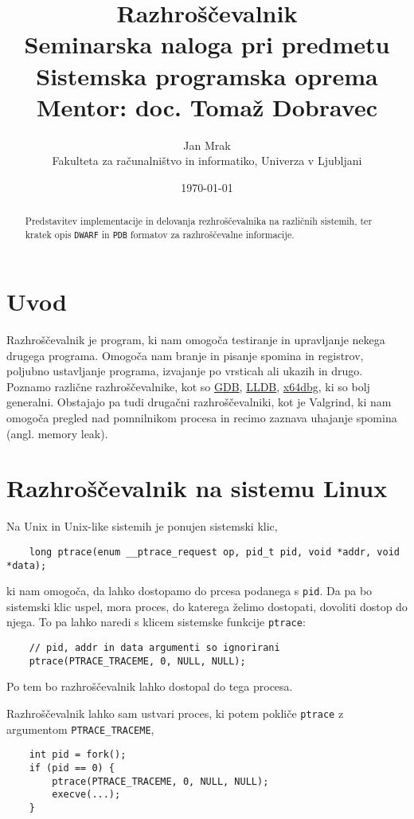 \documentclass[a4paper,notitlepage]{article}
\author{Jan Mrak \\
    \small Fakulteta za računalništvo in informatiko, Univerza v Ljubljani}
\title{Razhroščevalnik\\
    \small Seminarska naloga pri predmetu Sistemska programska oprema
    \\
    \small Mentor: doc. Tomaž Dobravec}
\date{\today}
\newcommand{\code}[1]{\texttt{#1}}
\begin{document}
\maketitle
\thispagestyle{empty}

\begin{abstract}
	Predstavitev implementacije in delovanja rezhroščevalnika na različnih sistemih, ter kratek opis \code{DWARF} in \code{PDB} formatov za razhroščevalne informacije.
\end{abstract}

\section{Uvod}

Razhroščevalnik je program, ki nam omogoča testiranje in upravljanje nekega drugega programa. Omogoča nam branje in pisanje spomina in registrov, poljubno ustavljanje programa, izvajanje po vrsticah ali ukazih in drugo.
Poznamo različne razhroščevalnike, kot so \href{https://www.sourceware.org/gdb/}{GDB}, \href{https://lldb.llvm.org/}{LLDB}, \href{https://x64dbg.com/}{x64dbg}, ki so bolj generalni. Obstajajo pa tudi drugačni razhroščevalniki, kot je Valgrind, ki nam omogoča pregled nad pomnilnikom procesa in recimo zaznava uhajanje spomina (angl. memory leak).

\section{Razhroščevalnik na sistemu Linux}

Na Unix in Unix-like sistemih je ponujen sistemski klic,
\begin{verbatim}
    long ptrace(enum __ptrace_request op, pid_t pid, void *addr, void *data);    
\end{verbatim}
ki nam omogoča, da lahko dostopamo do prcesa podanega s \code{pid}. Da pa bo sistemski klic uspel, mora proces, do katerega želimo dostopati, dovoliti dostop do njega.
To pa lahko naredi s klicem sistemske funkcije \code{ptrace}:
\begin{verbatim}
    // pid, addr in data argumenti so ignorirani
    ptrace(PTRACE_TRACEME, 0, NULL, NULL);
\end{verbatim}

Po tem bo razhroščevalnik lahko dostopal do tega procesa.

Razhroščevalnik lahko sam ustvari proces, ki potem pokliče \code{ptrace} z argumentom \code{PTRACE_TRACEME},

\begin{verbatim}
    int pid = fork();
    if (pid == 0) {
        ptrace(PTRACE_TRACEME, 0, NULL, NULL);
        execve(...);
    }
\end{verbatim}
\end{document}
